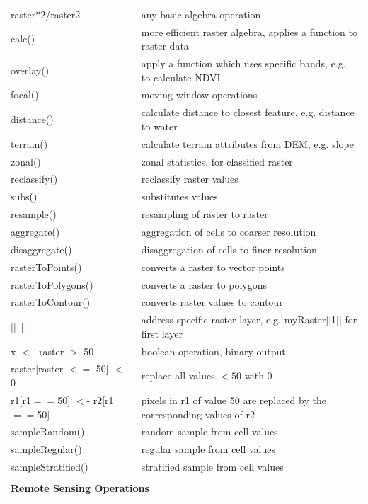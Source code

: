 \documentclass[10pt,landscape]{article}
\begin{document}
\begin{multicols}{3}
\begin{tabular}{@{}p{\the\MyLen}%
                @{}p{\linewidth-\the\MyLen}@{}}
raster*2/raster2 & any basic algebra operation \\                
calc()  	& more efficient raster algebra, applies a function to raster data \\
overlay()       & apply a function which uses specific bands, e.g. to calculate
NDVI
\\
focal()         & moving window operations \\
distance()      & calculate distance to closest feature, e.g. distance to water\\
terrain() 	& calculate terrain attributes from DEM, e.g. slope \\
zonal()         & zonal statistics, for classified raster\\
reclassify()	& reclassify raster values \\
subs()		& substitutes values \\
resample() 	& resampling of raster to raster \\
aggregate()	& aggregation of cells to coarser resolution\\
disaggregate()	& disaggregation of cells to finer resolution\\
rasterToPoints() & converts a raster to vector points	\\
rasterToPolygons() & converts a raster to polygons \\
rasterToContour()  & converts raster values to contour \\
$[[$\ $]]$		& address specific raster layer, e.g. myRaster[[1]] for first layer    \\  
x $<$- raster $>$ 50	& boolean operation, binary output \\
raster[raster $<=$ 50] $<$- 0 & replace all values $< 50$ with 0 \\
r1[r1$==$50] $<$- r2[r1$==$50] & pixels in r1 of value 50 are replaced by the
corresponding values of r2 \\
  sampleRandom() & random sample from cell values\\
  sampleRegular() & regular sample from cell values\\
  sampleStratified() & stratified sample from cell values\\

     & \\
  
   
 \multicolumn{2}{l}{\textbf{Remote Sensing Operations}} \\

  


\end{tabular}
\end{multicols}
\end{document}
